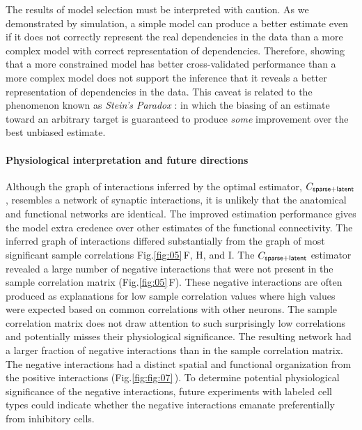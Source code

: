 \documentclass[10pt]{article}
\newcommand{\figref}[2]{Fig.\;\ref{fig:#1}\,#2}
\begin{document}
The results of model selection must be interpreted with caution.  As we demonstrated by simulation, a simple model can produce a better estimate even if it does not correctly represent the real dependencies in the data than a more complex model with correct representation of dependencies.   Therefore, showing that a more constrained model has better cross-validated performance than a more complex model does not support the inference that it reveals a better representation of dependencies in the data.  This caveat is related to the phenomenon known as \emph{Stein's Paradox} \cite{Efron:1977}: in which the biasing of an estimate toward an arbitrary target is guaranteed to produce \emph{some} improvement over the best unbiased estimate.

\paragraph{Physiological interpretation and future directions}
Although the graph of interactions inferred by the optimal estimator, $C_{\sf sparse+latent}$, resembles a network of synaptic interactions, it is unlikely that the anatomical and functional networks are identical.  The improved estimation performance gives the model extra credence over other estimates of the functional connectivity.  The inferred graph of interactions differed substantially from the graph of most significant sample correlations \figref{05}{F, H, and I}.  The $C_{\sf sparse+latent}$ estimator revealed a large number of negative interactions that were not present in the sample correlation matrix (\figref{05}{F}).  These negative interactions are often produced as explanations for low sample correlation values where high values were expected based on common correlations with other neurons.  The sample correlation matrix does not draw attention to such surprisingly low correlations and potentially misses their physiological significance.  The resulting network had a larger fraction of negative interactions than in the sample correlation matrix. The negative interactions had a distinct spatial and functional organization from the positive interactions (\figref{fig:07}).  To determine potential physiological significance of the negative interactions, future experiments with labeled cell types could indicate whether the negative interactions emanate preferentially from inhibitory cells. 
\end{document}

